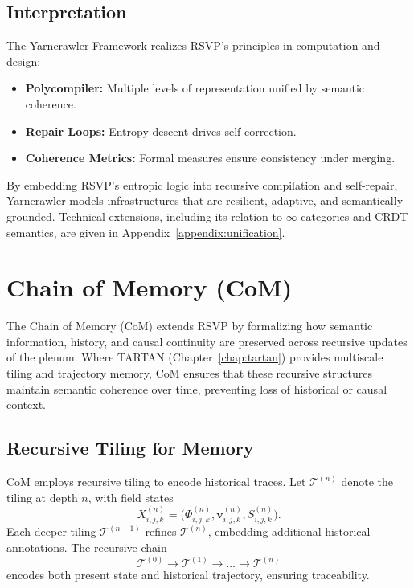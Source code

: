 \documentclass[12pt]{report}
\begin{document}
\section{Interpretation}

The Yarncrawler Framework realizes RSVP’s principles in computation and design:
\begin{itemize}
    \item \textbf{Polycompiler:} Multiple levels of representation unified by semantic coherence.  
    \item \textbf{Repair Loops:} Entropy descent drives self-correction.  
    \item \textbf{Coherence Metrics:} Formal measures ensure consistency under merging.  
\end{itemize}

By embedding RSVP’s entropic logic into recursive compilation and self-repair, Yarncrawler models infrastructures that are resilient, adaptive, and semantically grounded. Technical extensions, including its relation to $\infty$-categories and CRDT semantics, are given in Appendix~\ref{appendix:unification}.


\chapter{Chain of Memory (CoM)}

The Chain of Memory (CoM) extends RSVP by formalizing how semantic information, history, and causal continuity are preserved across recursive updates of the plenum.  
Where TARTAN (Chapter~\ref{chap:tartan}) provides multiscale tiling and trajectory memory, CoM ensures that these recursive structures maintain semantic coherence over time, preventing loss of historical or causal context.

\section{Recursive Tiling for Memory}

CoM employs recursive tiling to encode historical traces. Let $\mathcal{T}^{(n)}$ denote the tiling at depth $n$, with field states
\[
X^{(n)}_{i,j,k} = \big(\Phi^{(n)}_{i,j,k}, \mathbf{v}^{(n)}_{i,j,k}, S^{(n)}_{i,j,k}\big).
\]
Each deeper tiling $\mathcal{T}^{(n+1)}$ refines $\mathcal{T}^{(n)}$, embedding additional historical annotations.  
The recursive chain
\[
\mathcal{T}^{(0)} \to \mathcal{T}^{(1)} \to \dots \to \mathcal{T}^{(n)}
\]
encodes both present state and historical trajectory, ensuring traceability.
\end{document}
